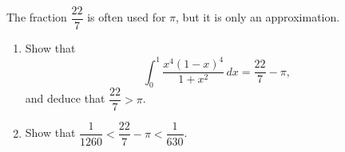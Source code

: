 The fraction $\dfrac{22}{7}$ is often used for $\pi$, but it is only an approximation.
\begin{enumerate}
\item[(a)] Show that
\[
\int_0^1\dfrac{x^4(1-x)^4}{1+x^2}\,dx=\dfrac{22}{7}-\pi ,
\]
and deduce that $\dfrac{22}{7}>\pi$.
\item[(b)] Show that $\dfrac{1}{1260}<\dfrac{22}{7}-\pi<\dfrac{1}{630}$.
\end{enumerate}
